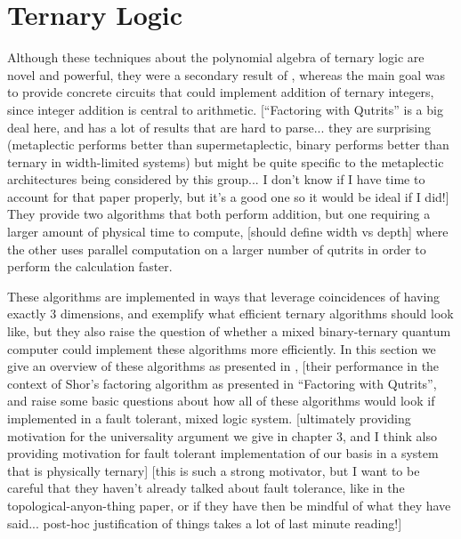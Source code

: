 \documentclass[]{article}
\begin{document}
\section{Ternary Logic}
Although these techniques about the polynomial algebra of ternary logic are novel and powerful, they were a secondary result of \cite{arithmetics}, whereas the main goal was to provide concrete circuits that could implement addition of ternary integers, since integer addition is central to arithmetic. [``Factoring with Qutrits'' is a big deal here, and has a lot of results that are hard to parse... they are surprising (metaplectic performs better than supermetaplectic, binary performs better than ternary in width-limited systems) but might be quite specific to the metaplectic architectures being considered by this group... I don't know if I have time to account for that paper properly, but it's a good one so it would be ideal if I did!] They provide two algorithms that both perform addition, but one requiring a larger amount of physical time to compute, [should define width vs depth] where the other uses parallel computation on a larger number of qutrits in order to perform the calculation faster.

These algorithms are implemented in ways that leverage coincidences of having exactly 3 dimensions, and exemplify what efficient ternary algorithms should look like, but they also raise the question of whether a mixed binary-ternary quantum computer could implement these algorithms more efficiently. In this section we give an overview of these algorithms as presented in \cite{arithmetics}, [their performance in the context of Shor's factoring algorithm as presented in ``Factoring with Qutrits'', and raise some basic questions about how all of these algorithms would look if implemented in a fault tolerant, mixed logic system. [ultimately providing motivation for the universality argument we give in chapter 3, and I think also providing motivation for fault tolerant implementation of our basis in a system that is physically ternary] [this is such a strong motivator, but I want to be careful that they haven't already talked about fault tolerance, like in the topological-anyon-thing paper, or if they have then be mindful of what they have said... post-hoc justification of things takes a lot of last minute reading!]
\end{document}
